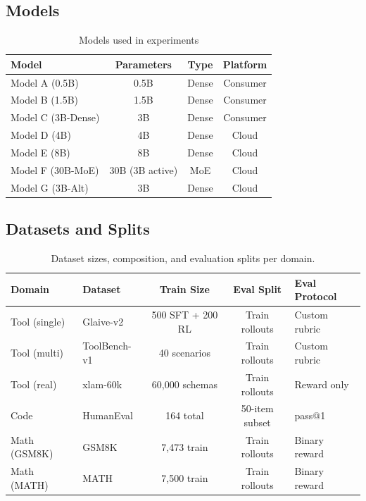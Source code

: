 \documentclass{article}
\begin{document}
\subsection{Models}

\begin{table}[htbp]
    \centering
    \caption{Models used in experiments}
    \begin{tabular}{lccc}
        \toprule
        Model & Parameters & Type & Platform \\
        \midrule
        Model A (0.5B) & 0.5B & Dense & Consumer \\
        Model B (1.5B) & 1.5B & Dense & Consumer \\
        Model C (3B-Dense) & 3B & Dense & Consumer \\
        Model D (4B) & 4B & Dense & Cloud \\
        Model E (8B) & 8B & Dense & Cloud \\
        Model F (30B-MoE) & 30B (3B active) & MoE & Cloud \\
        Model G (3B-Alt) & 3B & Dense & Cloud \\
        \bottomrule
    \end{tabular}
    \label{tab:models}
\end{table}

\subsection{Datasets and Splits}

\begin{table}[htbp]
    \centering
    \caption{Dataset sizes, composition, and evaluation splits per domain.}
    \begin{tabular}{llccl}
        \toprule
        Domain & Dataset & Train Size & Eval Split & Eval Protocol \\
        \midrule
        Tool (single) & Glaive-v2 & 500 SFT + 200 RL & Train rollouts & Custom rubric \\
        Tool (multi) & ToolBench-v1 & 40 scenarios & Train rollouts & Custom rubric \\
        Tool (real) & xlam-60k & 60,000 schemas & Train rollouts & Reward only \\
        Code & HumanEval & 164 total & 50-item subset & pass@1 \\
        Math (GSM8K) & GSM8K & 7,473 train & Train rollouts & Binary reward \\
        Math (MATH) & MATH & 7,500 train & Train rollouts & Binary reward \\
        \bottomrule
    \end{tabular}
    \label{tab:datasets}
\end{table}
\end{document}
